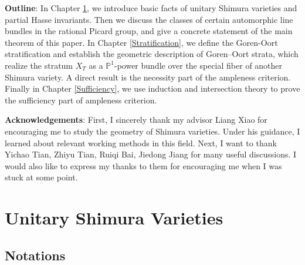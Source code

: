 \documentclass{article}
\begin{document}
\medskip
\noindent
\textbf{Outline}: In Chapter \ref{Unitary Shimura Varieties}, we introduce basic facts of unitary Shimura varieties and partial Hasse invariants. Then we discuss the classes of certain automorphic line bundles in the rational Picard group, and give a concrete statement of the main theorem of this paper. In Chapter \ref{Stratification}, we define the Goren-Oort stratification and establish the geometric description of Goren--Oort strata, which realize the stratum $X_T$ as a $\mathbb{P}^1$-power bundle over the special fiber of another Shimura variety. A direct result is the necessity part of the ampleness criterion. Finally in Chapter \ref{Sufficiency}, we use induction and intersection theory to prove the sufficiency part of ampleness criterion.


\medskip
\noindent
\textbf{Acknowledgements}: First, I sincerely thank my advisor Liang Xiao for encouraging me to study the geometry of Shimura varieties. Under his guidance, I learned about relevant working methods in this field. Next, I want to thank Yichao Tian, Zhiyu Tian, Ruiqi Bai, Jiedong Jiang for many useful discussions. I would also like to express my thanks to them for encouraging me when I was stuck at some point.















\section{Unitary Shimura Varieties}\label{Unitary Shimura Varieties}

\subsection{Notations}
\end{document}
